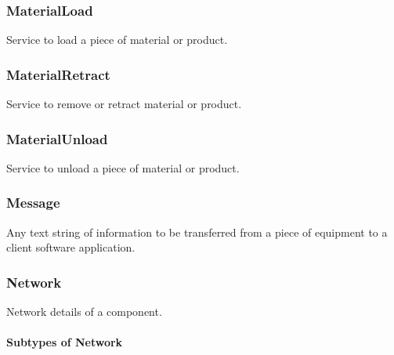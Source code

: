 \subsubsection{MaterialLoad}
\label{sec:MaterialLoad}



Service to load a piece of material or product.



\subsubsection{MaterialRetract}
\label{sec:MaterialRetract}



Service to remove or retract material or product.



\subsubsection{MaterialUnload}
\label{sec:MaterialUnload}



Service to unload a piece of material or product.



\subsubsection{Message}
\label{sec:Message}



Any text string of information to be transferred from a piece of equipment to a client software application.



\subsubsection{Network}
\label{sec:Network}



Network details of a component.


\paragraph{Subtypes of Network}\mbox{}
\label{sec:Subtypes of Network}

